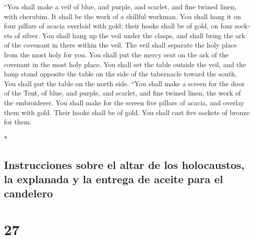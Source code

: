 \begin{paracol}{2}
\begin{otherlanguage}{english}
 ``You shall make a veil of blue, and purple, and
scarlet, and fine twined linen, with cherubim. It shall be the work of a
skillful workman.  You shall hang it on four pillars of
acacia overlaid with gold; their hooks shall be of gold, on four sockets
of silver.  You shall hang up the veil under the clasps,
and shall bring the ark of the covenant in there within the veil. The
veil shall separate the holy place from the most holy for you.
 You shall put the mercy seat on the ark of the covenant
in the most holy place.  You shall set the table outside
the veil, and the lamp stand opposite the table on the side of the
tabernacle toward the south. You shall put the table on the north side.
 ``You shall make a screen for the door of the Tent, of
blue, and purple, and scarlet, and fine twined linen, the work of the
embroiderer.  You shall make for the screen five pillars
of acacia, and overlay them with gold. Their hooks shall be of gold. You
shall cast five sockets of bronze for them.

\end{otherlanguage}

\switchcolumn[0]*

\hypertarget{instrucciones-sobre-el-altar-de-los-holocaustos-la-explanada-y-la-entrega-de-aceite-para-el-candelero}{%
\subsection{Instrucciones sobre el altar de los holocaustos, la
explanada y la entrega de aceite para el
candelero}\label{instrucciones-sobre-el-altar-de-los-holocaustos-la-explanada-y-la-entrega-de-aceite-para-el-candelero}}

\hypertarget{section-52}{%
\section{27}\label{section-52}}


\end{paracol}
